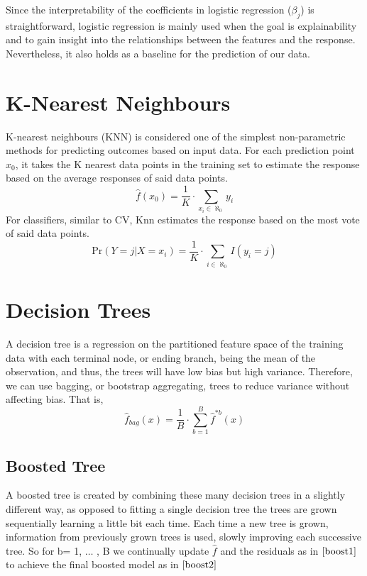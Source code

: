 \documentclass[12pt]{report}
\begin{document}
Since the interpretability of the coefficients in logistic regression ($\beta_{j}$) is straightforward, logistic regression is mainly used when the goal is explainability and to gain insight into the relationships between the features and the response. Nevertheless, it also holds as a baseline for the prediction of our data.

\section{K-Nearest Neighbours}

K-nearest neighbours (KNN) is considered one of the simplest non-parametric methods for predicting outcomes based on input data. For each prediction point $x_{0}$, it takes the K nearest data points in the training set to estimate the response based on the average responses of said data points. 
\begin{equation}
    \hat{f}(x_{0}) = \frac{1}{K}\cdot\sum_{x_{i}\in \aleph_{0}} y_{i}
\end{equation}
For classifiers, similar to CV, Knn estimates the response based on the most vote of said data points.
\begin{equation}
    \text{Pr}(Y=j|X=x_i) = \frac{1}{K}\cdot\sum_{i\in \aleph_{0}}I(y_i=j)
\end{equation}

\section{Decision Trees}

A decision tree is a regression on the partitioned feature space of the training data with each terminal node, or ending branch, being the mean of the observation, and thus, the trees will have low bias but high variance. Therefore, we can use bagging, or bootstrap aggregating, trees to reduce variance without affecting bias. That is,
\begin{equation}
    \hat{f}_{bag}(x) = \frac{1}{B}\cdot\sum^{B}_{b=1}\hat{f}^{*b}(x)
\end{equation}

\subsection{Boosted Tree}
A boosted tree is created by combining these many decision trees in a slightly different way, as opposed to fitting a single decision tree the trees are grown sequentially learning a little bit each time. Each time a new tree is grown, information from previously grown trees is used, slowly improving each successive tree. So for b= 1, $\hdots$ , B we continually update $\hat{f}$ and the residuals as in $\eqref{boost1}$ to achieve the final boosted model as in $\eqref{boost2}$ 
\end{document}
